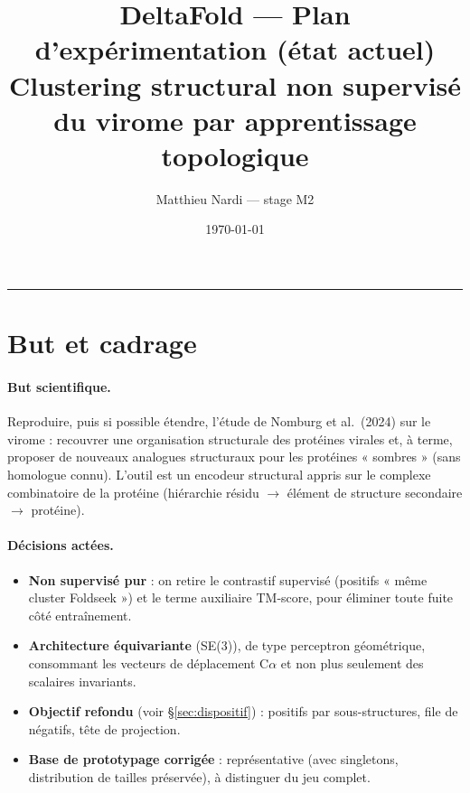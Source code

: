 \documentclass[11pt,a4paper]{article}
\title{DeltaFold --- Plan d'expérimentation (état actuel)\\[2pt]
\large Clustering structural non supervisé du virome par apprentissage topologique}
\author{Matthieu Nardi --- stage M2}
\date{\today}
\begin{document}
\maketitle

\begin{center}
\end{center}

\tableofcontents
\vspace{4pt}
\hrule

\section{But et cadrage}

\paragraph{But scientifique.} Reproduire, puis si possible étendre, l'étude de
Nomburg et al.\ (2024) sur le virome : recouvrer une organisation structurale des
protéines virales et, à terme, proposer de nouveaux analogues structuraux pour les
protéines « sombres » (sans homologue connu). L'outil est un encodeur structural
appris sur le complexe combinatoire de la protéine (hiérarchie
résidu $\to$ élément de structure secondaire $\to$ protéine).

\paragraph{Décisions actées.}
\begin{itemize}[leftmargin=1.4em,itemsep=2pt]
  \item \textbf{Non supervisé pur} : on retire le contrastif supervisé (positifs
        « même cluster Foldseek ») et le terme auxiliaire TM-score, pour éliminer
        toute fuite côté entraînement.
  \item \textbf{Architecture équivariante} (SE(3)), de type perceptron géométrique,
        consommant les vecteurs de déplacement C$\alpha$ et non plus seulement des
        scalaires invariants.
  \item \textbf{Objectif refondu} (voir §\ref{sec:dispositif}) : positifs par
        sous-structures, file de négatifs, tête de projection.
  \item \textbf{Base de prototypage corrigée} : représentative (avec singletons,
        distribution de tailles préservée), à distinguer du jeu complet.
\end{itemize}
\end{document}
